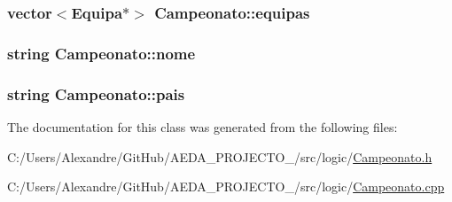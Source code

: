 \subsubsection[{equipas}]{\setlength{\rightskip}{0pt plus 5cm}vector$<${\bf Equipa}$\ast$$>$ Campeonato\+::equipas\hspace{0.3cm}{\ttfamily [private]}}\label{class_campeonato_ab677d5217856ce0ff2887a0e335caf2d}
\hypertarget{class_campeonato_a670b0857b7a8bc3c5dbf0f927ee192fe}{}
\subsubsection[{nome}]{\setlength{\rightskip}{0pt plus 5cm}string Campeonato\+::nome\hspace{0.3cm}{\ttfamily [private]}}\label{class_campeonato_a670b0857b7a8bc3c5dbf0f927ee192fe}
\hypertarget{class_campeonato_a9f7011b322e9ae5fe6504ca5946268bf}{}
\subsubsection[{pais}]{\setlength{\rightskip}{0pt plus 5cm}string Campeonato\+::pais\hspace{0.3cm}{\ttfamily [private]}}\label{class_campeonato_a9f7011b322e9ae5fe6504ca5946268bf}


The documentation for this class was generated from the following files\+:\begin{DoxyCompactItemize}
\item 
C\+:/\+Users/\+Alexandre/\+Git\+Hub/\+A\+E\+D\+A\+\_\+\+P\+R\+O\+J\+E\+C\+T\+O\+\_/src/logic/\hyperlink{_campeonato_8h}{Campeonato.\+h}\item 
C\+:/\+Users/\+Alexandre/\+Git\+Hub/\+A\+E\+D\+A\+\_\+\+P\+R\+O\+J\+E\+C\+T\+O\+\_/src/logic/\hyperlink{_campeonato_8cpp}{Campeonato.\+cpp}\end{DoxyCompactItemize}
